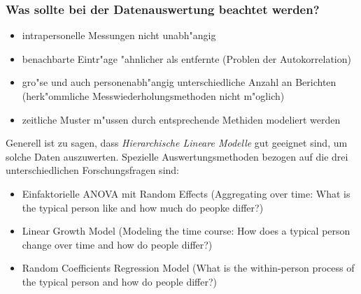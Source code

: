 \subsubsection{Was sollte bei der Datenauswertung beachtet werden?}
\begin{itemize}
        \item intrapersonelle Messungen nicht unabh"angig
        \item benachbarte Eintr"age "ahnlicher als entfernte (Problen der Autokorrelation)
        \item gro"se und auch personenabh"angig unterschiedliche Anzahl an Berichten (herk"ommliche Messwiederholungsmethoden nicht m"oglich)
        \item zeitliche Muster m"ussen durch entsprechende Methiden modeliert werden
\end{itemize}

Generell ist zu sagen, dass \emph{Hierarchische Lineare Modelle} gut geeignet sind, um solche Daten auszuwerten. Spezielle Auswertungsmethoden bezogen auf die drei unterschiedlichen Forschungsfragen sind:
\begin{itemize}
        \item Einfaktorielle ANOVA mit Random Effects (Aggregating over time: What is the typical person like and how much do peopke differ?) 
        \item Linear Growth Model (Modeling the time course: How does a typical person change over time and how do people differ?)
        \item Random Coefficients Regression Model (What is the within-person process of the typical person and how do people differ?)
\end{itemize}


